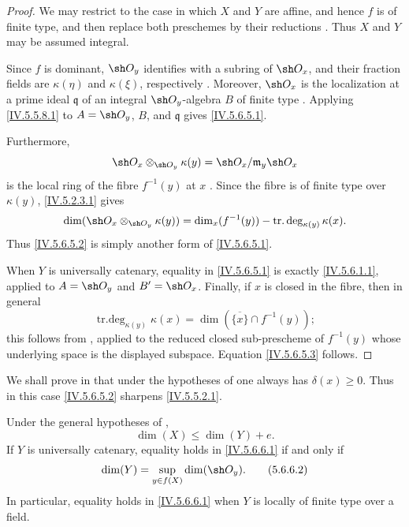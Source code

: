 \begin{proof}
We may restrict to the case in which $X$ and $Y$ are affine, and
hence $f$ is of finite type, and then replace both preschemes by
their reductions .  Thus $X$ and $Y$ may be assumed
integral.

Since $f$ is dominant, $\sh O_y$ identifies with a subring of
$\sh O_x$, and their fraction fields are
$\kappa(\eta)$ and $\kappa(\xi)$, respectively
.  Moreover, $\sh O_x$ is the localization at a
prime ideal $\mathfrak q$ of an integral $\sh O_y$-algebra $B$ of
finite type .  Applying
\eqref{IV.5.5.8.1} to $A=\sh O_y$, $B$, and $\mathfrak q$ gives
\eqref{IV.5.6.5.1}.

Furthermore,
\[
\sh O_x\otimes_{\sh O_y}\kappa(y)
 =\sh O_x/\mathfrak m_y\sh O_x
\]
is the local ring of the fibre $f^{-1}(y)$ at $x$
.  Since the fibre is of finite type over
$\kappa(y)$, \eqref{IV.5.2.3.1} gives
\[
\dim(\sh O_x\otimes_{\sh O_y}\kappa(y))
 =\dim_x(f^{-1}(y))
  -\operatorname{tr.deg}_{\kappa(y)}\kappa(x).
\]
Thus \eqref{IV.5.6.5.2} is simply another form of
\eqref{IV.5.6.5.1}.


When $Y$ is universally catenary, equality in
\eqref{IV.5.6.5.1} is exactly \eqref{IV.5.6.1.1}, applied to
$A=\sh O_y$ and $B'=\sh O_x$.  Finally, if $x$ is closed in the
fibre, then in general
\[
\operatorname{tr.deg}_{\kappa(y)}\kappa(x)
 =\dim(\overline{\{x\}}\cap f^{-1}(y));
\]
this follows from , applied to the reduced closed
sub-prescheme of $f^{-1}(y)$ whose underlying space is the displayed
subspace.  Equation \eqref{IV.5.6.5.3} follows.
\end{proof}

We shall prove in  that under the hypotheses of
 one always has $\delta(x)\geq0$.  Thus in this case
\eqref{IV.5.6.5.2} sharpens \eqref{IV.5.5.2.1}.

\begin{corollary}[5.6.6]
\label{IV.5.6.6}
Under the general hypotheses of ,
\begin{equation}
\dim(X)\leq\dim(Y)+e.
\tag{5.6.6.1}\label{IV.5.6.6.1}
\end{equation}
If $Y$ is universally catenary, equality holds in
\eqref{IV.5.6.6.1} if and only if
\begin{equation}
\dim(Y)=\sup_{y\in f(X)}\dim(\sh O_y).
\tag{5.6.6.2}\label{IV.5.6.6.2}
\end{equation}
In particular, equality holds in \eqref{IV.5.6.6.1} when $Y$ is
locally of finite type over a field.
\end{corollary}

